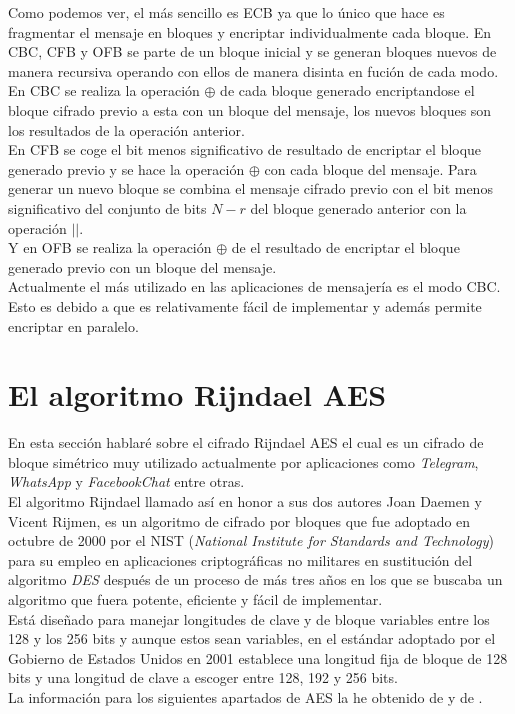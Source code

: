 \newpage
Como podemos ver, el más sencillo es ECB ya que lo único que hace es fragmentar el mensaje en bloques y encriptar individualmente cada bloque. En CBC, CFB y OFB se parte de un bloque inicial y se generan bloques nuevos de manera recursiva operando con ellos de manera disinta en fución de cada modo.\\ 
En CBC se realiza la operación $\oplus$ de cada bloque generado encriptandose el bloque cifrado previo a esta con un bloque del mensaje, los nuevos bloques son los resultados de la operación anterior.\\
En CFB se coge el bit menos significativo de resultado de encriptar el bloque generado previo y se hace la operación $\oplus$ con cada bloque del mensaje. Para generar un nuevo bloque se combina el mensaje cifrado previo con el bit menos significativo del conjunto de bits $N-r$ del bloque generado anterior con la operación $||$.\\
Y en OFB se realiza la operación $\oplus$ de el resultado de encriptar el bloque generado previo con un bloque del mensaje.\\
Actualmente el más utilizado en las aplicaciones de mensajería es el modo CBC. Esto es debido a que es relativamente fácil de implementar y además permite encriptar en paralelo.
\section{El algoritmo Rijndael AES}
En esta sección hablaré sobre el cifrado Rijndael AES el cual es un cifrado de bloque simétrico muy utilizado actualmente por aplicaciones como \emph{Telegram}, \emph{WhatsApp} y \emph{FacebookChat} entre otras.\\
El algoritmo Rijndael llamado así en honor a sus dos autores Joan Daemen y Vicent Rijmen, es un algoritmo de cifrado por bloques que fue adoptado en octubre de 2000 por el NIST (\emph{National Institute for Standards and Technology}) para su empleo en aplicaciones criptográficas no militares en sustitución del algoritmo \emph{DES} después de un proceso de más tres años en los que se buscaba un algoritmo que fuera potente, eficiente y fácil de implementar.\\
Está diseñado para manejar longitudes de clave y de bloque variables entre los 128 y los 256 bits y aunque estos sean variables, en el estándar adoptado por el Gobierno de Estados Unidos en 2001 \cite{aesUsa} establece una longitud fija de bloque de 128 bits y una longitud de clave a escoger entre 128, 192 y 256 bits.\\
La información para los siguientes apartados de AES la he obtenido de \cite{En2011} y de \cite{criptografia}.\\

